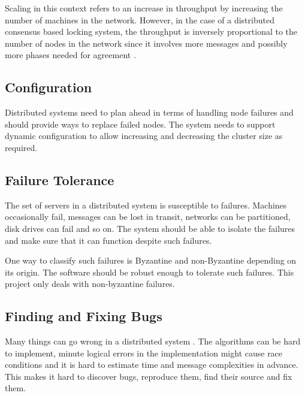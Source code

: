 Scaling in this context refers to an increase in throughput by increasing the
number of machines in the network. However, in the case of a distributed
consensus based locking system, the throughput is inversely proportional to the
number of nodes in the network since it involves more messages and possibly
more phases needed for agreement%
.

\subsection{Configuration}

Distributed systems need to plan ahead in terms of handling node failures and
should provide ways to replace failed nodes. The system needs to support dynamic
configuration to allow increasing and decreasing the cluster size as required.

\subsection{Failure Tolerance}

The set of servers in a distributed system is susceptible to failures.
Machines occasionally fail, messages can be lost in transit, networks can be
partitioned, disk drives can fail and so on. The system should be able to
isolate the failures and make sure that it can function despite such failures.

One way to classify such failures is Byzantine%
and non-Byzantine%
depending on its origin. The software should be robust enough to tolerate such
failures. This project only deals with non-byzantine failures.

\subsection{Finding and Fixing Bugs}

Many things can go wrong in a distributed system
\citep{Rotem-gal-oz_fallaciesof}. The algorithms can be hard to implement,
minute logical errors in the implementation might cause race conditions and
it is hard to estimate time and message complexities in advance. This makes it
hard to discover bugs, reproduce them, find their source and fix them.

